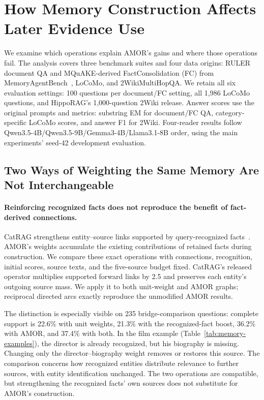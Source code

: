 \section{How Memory Construction Affects Later Evidence Use}
\label{sec:memory-use}

We examine which operations explain AMOR's gains and where those operations fail.
The analysis covers three benchmark suites and four data origins: RULER document QA and MQuAKE-derived FactConsolidation (FC) from MemoryAgentBench~\citep{hu2026memoryagentbench}, LoCoMo, and 2WikiMultiHopQA.
We retain all six evaluation settings: 100 questions per document/FC setting, all 1,986 LoCoMo questions, and HippoRAG's 1,000-question 2Wiki release.
Answer scores use the original prompts and metrics: substring EM for document/FC QA, category-specific LoCoMo scores, and answer F1 for 2Wiki.
Four-reader results follow Qwen3.5-4B/Qwen3.5-9B/Gemma3-4B/Llama3.1-8B order, using the main experiments' seed-42 development evaluation.

\subsection{Two Ways of Weighting the Same Memory Are Not Interchangeable}

\paragraph{Reinforcing recognized facts does not reproduce the benefit of fact-derived connections.}
CatRAG strengthens entity--source links supported by query-recognized facts~\citep{lau-etal-2026-breaking}.
AMOR's weights accumulate the existing contributions of retained facts during construction.
We compare these exact operations with connections, recognition, initial scores, source texts, and the five-source budget fixed.
CatRAG's released operator multiplies supported forward links by 2.5 and preserves each entity's outgoing source mass.
We apply it to both unit-weight and AMOR graphs; reciprocal directed arcs exactly reproduce the unmodified AMOR results.


The distinction is especially visible on 235 bridge-comparison questions: complete support is 22.6\% with unit weights, 21.3\% with the recognized-fact boost, 36.2\% with AMOR, and 37.4\% with both.
In the film example (Table~\ref{tab:memory-examples}), the director is already recognized, but his biography is missing.
Changing only the director--biography weight removes or restores this source.
The comparison concerns how recognized entities distribute relevance to further sources, with entity identification unchanged.
The two operations are compatible, but strengthening the recognized facts' own sources does not substitute for AMOR's construction.

